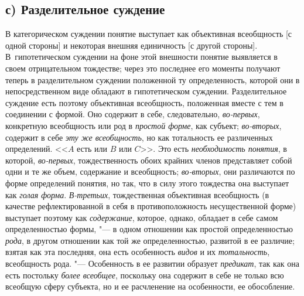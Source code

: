 \subsection[с) Разделительное суждение]{с) Разделительное суждение}
В категорическом суждении понятие выступает как объективная
всеобщность [с одной стороны] и некоторая внешняя единичность [с другой
стороны]. В~гипотетическом суждении на фоне этой внешности понятие
выявляется в своем отрицательном тождестве; через это последнее его моменты
получают теперь в разделительном суждении положенной ту определенность,
которой они в непосредственном виде обладают в гипотетическом суждении.
Разделительное суждение есть поэтому объективная всеобщность, положенная
вместе с тем в соединении с формой. Оно содержит в себе, следовательно,
{\em во-первых}, конкретную всеобщность или род в {\em простой форме}, как
субъект; {\em во-вторых}, содержит в себе {\em эту
же всеобщность}, но как тотальность ее
различенных определений. <<$A$ есть или $B$ или $C$>>. Это есть
{\em необходимость понятия}, в которой, {\em во-первых},
тождественность обоих крайних членов представляет собой одни
и те же объем, содержание и всеобщность;
{\em во-вторых}, они
различаются по форме определений понятия, но так, что в силу этого
тождества она выступает как {\em голая
форма}. {\em В-третьих},
тождественная объективная всеобщность (в качестве
рефлектированной в себя в противоположность несущественной форме) выступает
поэтому как {\em содержание},
которое, однако, обладает в себе самом определенностью
формы, "--- в одном отношении как простой определенностью
{\em рода}, в другом
отношении как той же определенностью, развитой в ее различие; взятая как
эта последняя, она есть особенность {\em видов} и их {\em тотальность},
всеобщность рода. "--- Особенность в ее развитии
образует {\em предикат}, так как она есть постольку {\em более всеобщее},
поскольку она содержит в себе не только всю всеобщую сферу
субъекта, но и ее расчленение на особенности, ее обособление.

